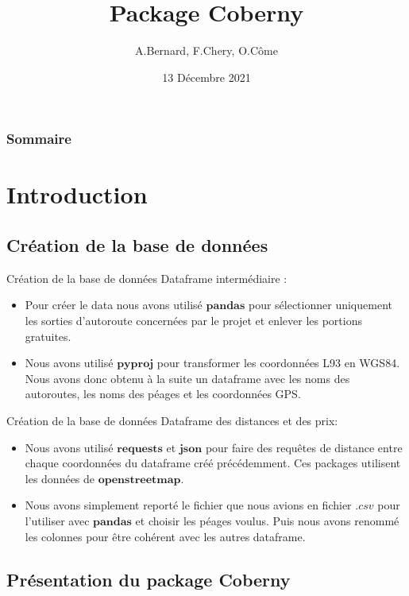 \documentclass{beamer}
\title{Package Coberny}
\author{A.Bernard, F.Chery, O.Côme}\institute{Faculté des sciences de Montpellier}
\date{13 Décembre 2021}
\begin{document}
\begin{frame}
\titlepage
\end{frame}

\begin{frame}
  \frametitle{Sommaire}
  \tableofcontents
\end{frame}

\section{Introduction}
\subsection{Création de la base de données}

\begin{frame}[fragile]{Création de la base de données}
Dataframe intermédiaire : \newline
\begin{itemize}
\item Pour créer le data nous avons utilisé $\textbf{pandas}$ pour sélectionner uniquement les sorties d'autoroute concernées par le projet et enlever les portions gratuites.  
\item Nous avons utilisé $\textbf{pyproj}$ pour transformer les coordonnées L93 en WGS84. Nous avons donc obtenu à la suite un dataframe avec les noms des autoroutes, les noms des péages et les coordonnées GPS.
\end{itemize}
\end{frame}

\begin{frame}[fragile]{Création de la base de données}
Dataframe des distances et des prix: \newline
\begin{itemize}
\item Nous avons utilisé $\textbf{requests}$ et $\textbf{json}$ pour faire des requêtes de distance entre chaque coordonnées du dataframe créé précédemment. Ces packages utilisent les données de $\textbf{openstreetmap}$.
\item Nous avons simplement reporté le fichier que nous avions en fichier $\textit{.csv}$ pour l'utiliser avec $\textbf{pandas}$ et choisir les péages voulus. Puis nous avons renommé les colonnes pour être cohérent avec les autres dataframe.
\end{itemize}
\end{frame}


\subsection{Présentation du package Coberny}
\end{document}
